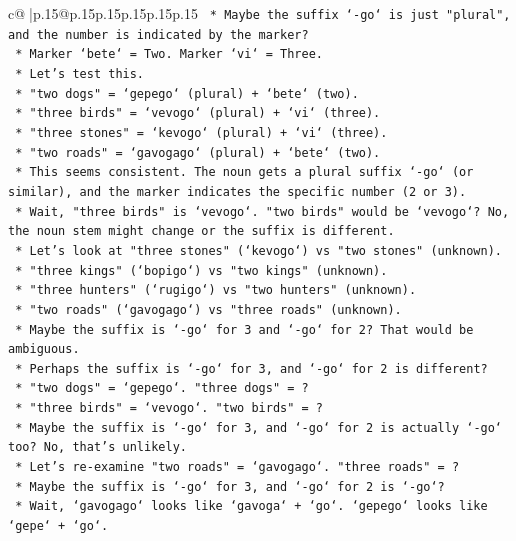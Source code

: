 \documentclass{article}
\begin{document}
{\begin{supertabular}{c@{$\;$}|p{.15\linewidth}@{}p{.15\linewidth}p{.15\linewidth}p{.15\linewidth}p{.15\linewidth}p{.15\linewidth}}
{{{\texttt{    *   Maybe the suffix `{-}go` is just "plural", and the number is indicated by the marker?} \\
\texttt{    *   Marker `bete` = Two. Marker `vi` = Three.} \\
\texttt{    *   Let's test this.} \\
\texttt{    *   "two dogs" = `gepego` (plural) + `bete` (two).} \\
\texttt{    *   "three birds" = `vevogo` (plural) + `vi` (three).} \\
\texttt{    *   "three stones" = `kevogo` (plural) + `vi` (three).} \\
\texttt{    *   "two roads" = `gavogago` (plural) + `bete` (two).} \\
\texttt{    *   This seems consistent. The noun gets a plural suffix `{-}go` (or similar), and the marker indicates the specific number (2 or 3).} \\
\texttt{    *   Wait, "three birds" is `vevogo`. "two birds" would be `vevogo`? No, the noun stem might change or the suffix is different.} \\
\texttt{    *   Let's look at "three stones" (`kevogo`) vs "two stones" (unknown).} \\
\texttt{    *   "three kings" (`bopigo`) vs "two kings" (unknown).} \\
\texttt{    *   "three hunters" (`rugigo`) vs "two hunters" (unknown).} \\
\texttt{    *   "two roads" (`gavogago`) vs "three roads" (unknown).} \\
\texttt{    *   Maybe the suffix is `{-}go` for 3 and `{-}go` for 2? That would be ambiguous.} \\
\texttt{    *   Perhaps the suffix is `{-}go` for 3, and `{-}go` for 2 is different?} \\
\texttt{    *   "two dogs" = `gepego`. "three dogs" = ?} \\
\texttt{    *   "three birds" = `vevogo`. "two birds" = ?} \\
\texttt{    *   Maybe the suffix is `{-}go` for 3, and `{-}go` for 2 is actually `{-}go` too? No, that's unlikely.} \\
\texttt{    *   Let's re{-}examine "two roads" = `gavogago`. "three roads" = ?} \\
\texttt{    *   Maybe the suffix is `{-}go` for 3, and `{-}go` for 2 is `{-}go`?} \\
\texttt{    *   Wait, `gavogago` looks like `gavoga` + `go`. `gepego` looks like `gepe` + `go`.} \\
}}}
\end{supertabular}}
\end{document}
